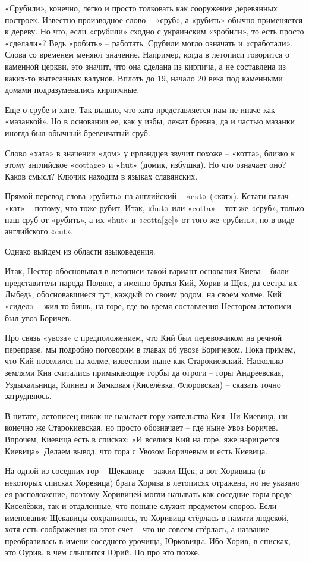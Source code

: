 «Срубили», конечно, легко и просто толковать как сооружение деревянных построек. Известно производное слово – «сруб», а «рубить» обычно применяется к дереву. Но что, если «срубили» сходно с украинским «зробили», то есть просто «сделали»? Ведь «робить» – работать. Срубили могло означать и «сработали». Слова со временем меняют значение. Например, когда в летописи говорится о каменной церкви, это значит, что она сделана из кирпича, а не составлена из каких-то вытесанных валунов. Вплоть до 19, начало 20 века под каменными домами подразумевались кирпичные.

Еще о срубе и хате. Так вышло, что хата представляется нам не иначе как «мазанкой». Но в основании ее, как у избы, лежат бревна, да и частью мазанки иногда был обычный бревенчатый сруб.

Слово «хата» в значении «дом» у ирландцев звучит похоже – «котта», близко к этому английское «cottage» и «hut» (домик, избушка). Но что означает оно? Каков смысл? Ключик находим в языках славянских.

Прямой перевод слова «рубить» на английский – «cut» («кат»). Кстати палач – «кат» – потому, что тоже рубит. Итак, «hut» или «cotta» – тот же «сруб», только наш сруб от «рубить», а их «hut» и «cotta[ge]» от того же «рубить», но в виде английского «cut».

Однако выйдем из области языковедения.

Итак, Нестор обосновывал в летописи такой вариант основания Киева – были представители народа Поляне, а именно братья Кий, Хорив и Щек, да сестра их Лыбедь, обосновавшиеся тут, каждый со своим родом, на своем холме. Кий «сидел» – жил то бишь, на горе, где во время составления Нестором летописи был увоз Боричев.

Про связь «увоза» с предположением, что Кий был перевозчиком на речной переправе, мы подробно поговорим в главах об увозе Боричевом. Пока примем, что Кий поселился на холме, известном ныне как Старокиевский. Насколько землями Кия считались примыкающие горбы да отроги – горы Андреевская, Уздыхальница, Клинец и Замковая (Киселёвка, Флоровская) – сказать точно затрудняюсь. 

В цитате, летописец никак не называет гору жительства Кия. Ни Киевица, ни конечно же Старокиевская, но просто обозначает – где ныне Увоз Боричев. Впрочем, Киевица есть в списках: «И вселися Кий на горе, яже нарицается Киевица». Делаем вывод, что гора с Увозом Боричевым и есть Киевица.

На одной из соседних гор – Щекавице – зажил Щек, а вот Хоривица (в некоторых списках Хор\textbf{е}вица) брата Хорива в летописях отражена, но не указано ея расположение, поэтому Хоривицей могли называть как соседние горы вроде Киселёвки, так и отдаленные, что поныне служит предметом споров. Если именование Щекавицы сохранилось, то Хоривица стёрлась в памяти людской, хотя есть соображения на этот счет – что не совсем стёрлась, а название преобразилась в имени соседнего урочища, Юрковицы. Ибо Хорив, в списках, это Оурив, в чем слышится Юрий. Но про это позже.

